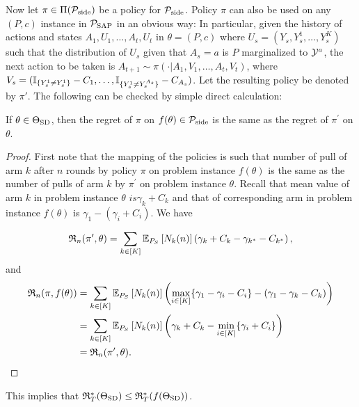 Now let $\pi\in \Pi(\mathcal{P}_{\mathrm{side}})$ be a policy for $\mathcal{P}_{\mathrm{side}}$.
Policy $\pi$ can also be used on any $(P,c)$ instance in $\mathcal{P}_{\mathrm{SAP}}$ in an obvious way:
In particular, given the history of actions and states $A_1,U_1,\dots,A_t,U_t$
in $\theta=(P,c)$ where $U_s = (Y_s,Y_s^1,\dots,Y_s^{K})$ such that 
the distribution of $U_s$ given that $A_s=a$ is $P$ marginalized to $\mathcal{Y}^{a}$,
the next action to be taken is 
$A_{t+1}\sim \pi(\cdot| A_1, V_1,\dots,A_t,V_t)$, where 
$V_s = (\mathbb{I}_{\{Y_s^1\ne Y_s^1\}}-C_1,\dots,\mathbb{I}_{\{Y_s^1\ne Y_s^{A_s}\}}-C_{A_s})$. Let the resulting policy be denoted by $\pi'$.
The following can be checked by simple direct calculation:
\begin{prop} 
If $\theta \in \Theta_{\mathrm{SD}}$, then the regret of $\pi$ on $f(\theta)\in \mathcal{P}_{\mathrm{side}}$
is the same as the regret of $\pi^\prime$ on $\theta$. 
\end{prop}
\begin{proof}First note that the mapping of the policies is such that number of pull of arm $k$ after $n$ rounds by policy $\pi$ on problem instance $f(\theta)$ is the same as the number of pulls of arm $k$ by $\pi^\prime$ on problem instance $\theta$. Recall that mean value of arm $k$ in problem instance $\theta$ $ is \gamma_k +C_k$ and that of corresponding arm in problem instance $f(\theta)$ is $\gamma_1-(\gamma_i+C_i)$. We have

\begin{align*}
\mathfrak{R}_n(\pi^\prime,\theta) = \sum_{k\in [K]} \mathbb{E}_{P_S}\left[N_k(n)\right](\gamma_k+C_k-\gamma_{k^*}-C_{k^*}) \,,
\end{align*}
and
\begin{align*}
\mathfrak{R}_n(\pi,f(\theta)) &= \sum_{k\in [K]} \mathbb{E}_{P_S}\left[N_k(n)\right]\left (\max_{i \in [K]}\{\gamma_1-\gamma_i- C_i\}-(\gamma_1-\gamma_k- C_k)\right) \\
&= \sum_{k\in [K]} \mathbb{E}_{P_S}\left[N_k(n)\right]\left (\gamma_k+ C_k - \min_{i \in [K]}\{\gamma_i+ C_i\}\right) \\
&=\mathfrak{R}_n(\pi^\prime,\theta).
\end{align*}
\end{proof}
This implies that $\mathfrak{R}_T^*(\Theta_{\mathrm{SD}})\le \mathfrak{R}_T^*(f(\Theta_{\mathrm{SD}}))$.

